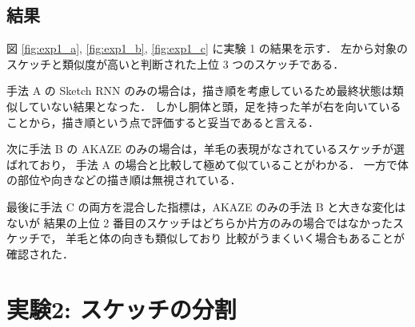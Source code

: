 \documentclass[twocolumn]{jarticle}     %
\begin{document}
\subsection{結果}



図 \ref{fig:exp1_a}, \ref{fig:exp1_b}, \ref{fig:exp1_c} に実験 1 の結果を示す．
左から対象のスケッチと類似度が高いと判断された上位 3 つのスケッチである．

手法 A の Sketch RNN のみの場合は，描き順を考慮しているため最終状態は類似していない結果となった．
しかし胴体と頭，足を持った羊が右を向いていることから，描き順という点で評価すると妥当であると言える．

次に手法 B の AKAZE のみの場合は，羊毛の表現がなされているスケッチが選ばれており，
手法 A の場合と比較して極めて似ていることがわかる．
一方で体の部位や向きなどの描き順は無視されている．

最後に手法 C の両方を混合した指標は，AKAZE のみの手法 B と大きな変化はないが
 結果の上位 2 番目のスケッチはどちらか片方のみの場合ではなかったスケッチで，
 羊毛と体の向きも類似しており 比較がうまくいく場合もあることが確認された．


\section{実験2: スケッチの分割}
\end{document}
